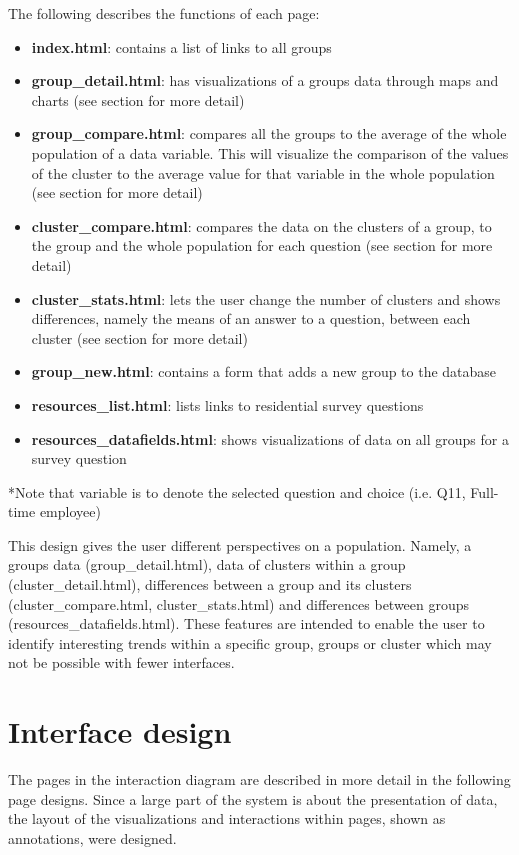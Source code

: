 The following describes the functions of each page:
\begin{itemize}
  \item \textbf{index.html}: contains a list of links to all groups
  \item \textbf{group\_detail.html}: has visualizations of a group\textquotesingle s data through maps and charts (see section for more detail)
  \item \textbf{group\_compare.html}: compares all the groups to the average of the whole population of a data variable. This will visualize the comparison of the values of the cluster to the average value for that variable in the whole population (see section for more detail)
  \item \textbf{cluster\_compare.html}: compares the data on the clusters of a group, to the group and the whole population for each question (see section for more detail)
  \item \textbf{cluster\_stats.html}: lets the user change the number of clusters and shows differences, namely the means of an answer to a question, between each cluster (see section for more detail)
  \item \textbf{group\_new.html}: contains a form that adds a new group to the database
  \item \textbf{resources\_list.html}: lists links to residential survey questions
  \item \textbf{resources\_datafields.html}: shows visualizations of data on all groups for a survey question
\end{itemize}

*Note that variable is to denote the selected question and choice (i.e. Q11, Full-time employee) \par

This design gives the user different perspectives on a population. Namely, a group\textquotesingle s data (group\_detail.html), data of clusters within a group (cluster\_detail.html), differences between a group and its clusters (cluster\_compare.html, cluster\_stats.html) and differences between groups (resources\_datafields.html). These features are intended to enable the user to identify interesting trends within a specific group, groups or cluster which may not be possible with fewer interfaces. 

\section{Interface design} \label{sec:interfacedesign}
The pages in the interaction diagram are described in more detail in the following page designs. Since a large part of the system is about the presentation of data, the layout of the visualizations and interactions within pages, shown as annotations, were designed.

